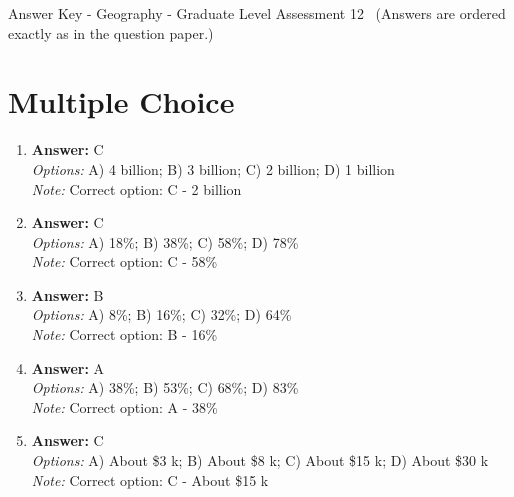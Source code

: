 \documentclass[12pt]{article}
\begin{document}
\begin{center}
Answer Key - Geography - Graduate Level Assessment 12 \
\small (Answers are ordered exactly as in the question paper.)
\end{center}

\section*{Multiple Choice}
\begin{enumerate}[label=\arabic*.]
\item \textbf{Answer:} C
\\ \textit{Options:} A) 4 billion; B) 3 billion; C) 2 billion; D) 1 billion
\\ \textit{Note:} Correct option: C - 2 billion
\item \textbf{Answer:} C
\\ \textit{Options:} A) 18\%; B) 38\%; C) 58\%; D) 78\%
\\ \textit{Note:} Correct option: C - 58\%
\item \textbf{Answer:} B
\\ \textit{Options:} A) 8\%; B) 16\%; C) 32\%; D) 64\%
\\ \textit{Note:} Correct option: B - 16\%
\item \textbf{Answer:} A
\\ \textit{Options:} A) 38\%; B) 53\%; C) 68\%; D) 83\%
\\ \textit{Note:} Correct option: A - 38\%
\item \textbf{Answer:} C
\\ \textit{Options:} A) About \$3 k; B) About \$8 k; C) About \$15 k; D) About \$30 k
\\ \textit{Note:} Correct option: C - About \$15 k
\end{enumerate}
\end{document}
